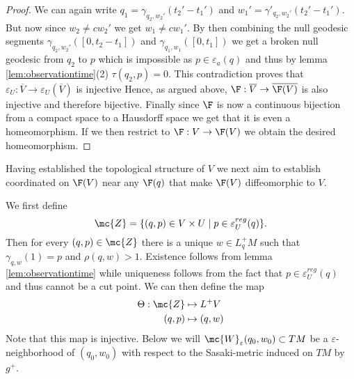 \begin{proof}
We can again write $q_1=\gamma_{q_2,w_2'}(t_2'-t_1')$ and $w_1'=\gamma'_{q_2,w_2'}(t_2'-t_1')$. But now since $w_2\neq cw_2'$ we get $w_1\neq cw_1'$. By then combining the null geodesic segments $\gamma_{q_2,w_2'}([0,t_2-t_1])$ and $\gamma_{q_1,w_1}([0,t_1])$ we get a broken null geodesic from $q_2$ to $p$ which is impossible as $p\in \varepsilon_a(q)$ and thus by lemma \ref{lem:observationtime}(2) $\tau(q_2,p)=0$. This contradiction proves that $\varepsilon_U:\overline{V}\to \varepsilon_U(\overline{V})$ is injective Hence, as argued above, $\F:\overline{V} \to \overline{\F(V)}$ is also injective and therefore bijective. Finally since $\F$ is now a continuous bijection from a compact space to a Hausdorff space we get that it is even a homeomorphism. If we then restrict to $\F:V\to \F(V)$ we obtain the desired homeomorphism.
\end{proof}

Having established the topological structure of $V$ we next aim to establish coordinated on $\F(V)$ near any $\F(q)$ that make $\F(V)$ diffeomorphic to $V$.

\begin{definition}[Coordinates on $V$]
We first define 
\[
    \mc{Z} = \{(q,p)\in V\times U \mid p\in \varepsilon_U^{reg}(q)\}.
\] 
Then for every $(q,p)\in \mc{Z}$ there is a unique $w\in L^+_qM$ such that $\gamma_{q,w}(1)=p$ and $\rho(q,w)>1$. Existence follows from lemma \ref{lem:observationtime} while uniqueness follows from the fact that $p\in \varepsilon_U^{reg}(q)$ and thus cannot be a cut point. 
We can then define the map
\begin{align*}
    \Theta:\mc{Z}&\mapsto L^+V\\
    (q,p)&\mapsto (q,w)
\end{align*}
Note that this map is injective.
Below we will $\mc{W}_\varepsilon(q_0,w_0)\subset TM$ be a $\varepsilon$-neighborhood of $(q_0,w_0)$ with respect to the Sasaki-metric induced on $TM$ by $g^+$.
\end{definition}

